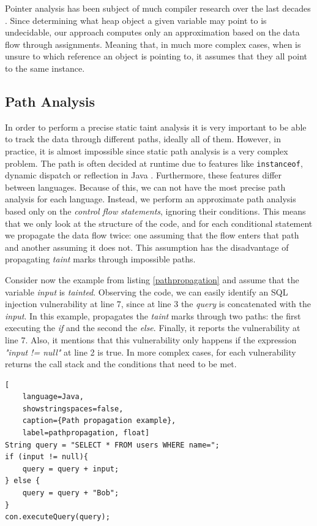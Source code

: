 Pointer analysis has been subject of much compiler research over the last decades \cite{spath2016boomerang,hind2001pointer}. Since determining what heap object a given variable may point to is undecidable, our approach computes only an approximation based on the data flow through assignments. Meaning that, in much more complex cases, when \toolname{} is unsure to which reference an object is pointing to, it assumes that they all point to the same instance.


\subsection{Path Analysis} In order to perform a precise static taint analysis it is very important to be able to track the data through different paths, ideally all of them. However, in practice, it is almost impossible since static path analysis is a very complex problem. The path is often decided at runtime due to features like \texttt{instanceof}, dynamic dispatch or reflection in Java \cite{hammer2008static}. Furthermore, these features differ between languages. Because of this, we can not have the most precise path analysis for each language. Instead, we perform an approximate path analysis based only on the \textit{control flow statements}, ignoring their conditions. This means that we only look at the structure of the code, and for each conditional statement we propagate the data flow twice: one assuming that the flow enters that path and another assuming it does not. This assumption has the disadvantage of propagating \textit{taint} marks through impossible paths.

Consider now the example from listing \ref{pathpropagation} and assume that the variable \textit{input} is \textit{tainted}. Observing the code, we can easily identify an SQL injection vulnerability at line 7, since at line 3 the \textit{query} is concatenated with the \textit{input}.
In this example, \toolname{} propagates the \textit{taint} marks through two paths: the first executing the \textit{if} and the second the \textit{else}. Finally, it reports the vulnerability at line 7. Also, it mentions that this vulnerability only happens if the expression \textit{"input != null"} at line 2 is true. In more complex cases, for each vulnerability \toolname{} returns the call stack and the conditions that need to be met.

\begin{lstlisting}[
    language=Java,
    showstringspaces=false,
    caption={Path propagation example},
    label=pathpropagation, float] 
String query = "SELECT * FROM users WHERE name=";
if (input != null){
    query = query + input;
} else {
    query = query + "Bob";
}
con.executeQuery(query);
\end{lstlisting}

